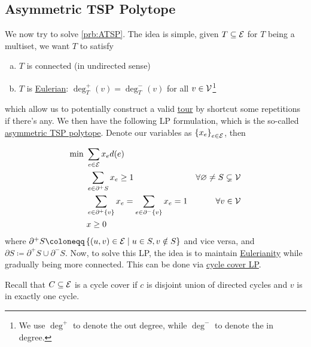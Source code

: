 \subsection{Asymmetric TSP Polytope}
We now try to solve \autoref{prb:ATSP}. The idea is simple, given \(T\subseteq \mathcal{\MakeUppercase{e}} \) for \(T\) being a multiset, we want \(T\) to satisfy
\begin{enumerate}[(a)]
	\item \(T\) is connected (in undirected sense)
	\item \(T\) is \href{https://en.wikipedia.org/wiki/Eulerian_path}{Eulerian}: \(\deg_T^+(v) = \deg_T^-(v)\) for all \(v\in \mathcal{\MakeUppercase{v}} \)\footnote{We use \(\deg^+\) to denote the out degree, while \(\deg^-\) to denote the in degree.}
\end{enumerate}
which allow us to potentially construct a valid \hyperref[def:tour]{tour} by shortcut some repetitions if there's any. We then have the following LP formulation, which is the so-called \hyperref[eq:ATSP-polytope]{asymmetric TSP polytope}. Denote our variables as \(\left\{ x_e \right\} _{e\in \mathcal{\MakeUppercase{e}} }\), then

\begin{equation}\label{eq:ATSP-polytope}
	\begin{aligned}
		\min~ & \sum_{e\in \mathcal{\MakeUppercase{e}} } x_e d(e)                                                                                             \\
		      & \sum_{e\in \partial ^+ S} x_e \geq 1                                      & \forall \varnothing \neq S \subsetneq \mathcal{\MakeUppercase{v}} \\
		      & \sum_{e\in \partial ^+ \{v\}} x_e = \sum_{e\in \partial ^- \{v\}} x_e = 1 & \forall v\in \mathcal{\MakeUppercase{v}}                          \\
		      & x \geq 0
	\end{aligned}
\end{equation}
where \(\partial ^+ S\coloneqq \left\{ (u, v)\in \mathcal{\MakeUppercase{e}} \mid u\in S, v \notin S \right\} \) and vice versa, and \(\partial S\coloneqq \partial ^+S \cup \partial ^-S\). Now, to solve this LP, the idea is to maintain \href{https://en.wikipedia.org/wiki/Eulerian_path}{Eulerianity} while gradually being more connected. This can be done via \hyperref[subsec:cycle-covering-LP]{cycle cover LP}.

\begin{prev}
	Recall that \(C \subseteq \mathcal{\MakeUppercase{e}} \) is a cycle cover if \(c\) is disjoint union of directed cycles and \(v\) is in exactly one cycle.
\end{prev}

